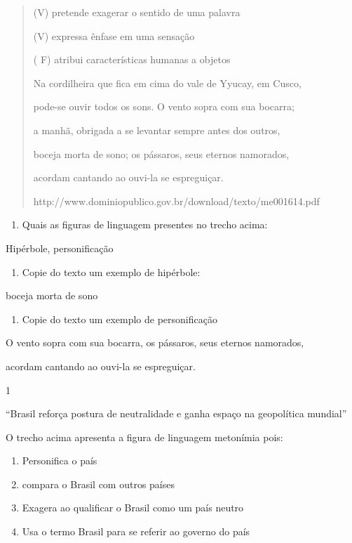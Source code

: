 {{\begin{quote}
(V) pretende exagerar o sentido de uma palavra

(V) expressa ênfase em uma sensação

( F) atribui características humanas a objetos

Na cordilheira que fica em cima do vale de Yyucay, em Cusco,

pode-se ouvir todos os sons. O vento sopra com sua bocarra;

a manhã, obrigada a se levantar sempre antes dos outros,

boceja morta de sono; os pássaros, seus eternos namorados,

acordam cantando ao ouvi-la se espreguiçar.

http://www.dominiopublico.gov.br/download/texto/me001614.pdf
\end{quote}

\begin{enumerate}
\def\labelenumi{\arabic{enumi})}
\setcounter{enumi}{7}
\tightlist
\item
  Quais as figuras de linguagem presentes no trecho acima:
\end{enumerate}

Hipérbole, personificação

\begin{enumerate}
\def\labelenumi{\arabic{enumi})}
\setcounter{enumi}{8}
\tightlist
\item
  Copie do texto um exemplo de hipérbole:
\end{enumerate}

boceja morta de sono

\begin{enumerate}
\def\labelenumi{\arabic{enumi})}
\setcounter{enumi}{9}
\tightlist
\item
  Copie do texto um exemplo de personificação
\end{enumerate}

O vento sopra com sua bocarra, os pássaros, seus eternos namorados,

acordam cantando ao ouvi-la se espreguiçar.


\num{1}

``Brasil reforça postura de neutralidade e ganha espaço na geopolítica
mundial''

O trecho acima apresenta a figura de linguagem metonímia pois:

\begin{enumerate}
\def\labelenumi{\alph{enumi})}
\item
  Personifica o país
\item
  compara o Brasil com outros países
\item
  Exagera ao qualificar o Brasil como um país neutro
\item
  Usa o termo Brasil para se referir ao governo do país
\end{enumerate}

}}

